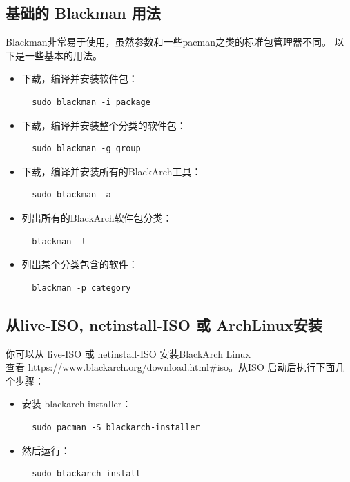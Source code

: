 \documentclass[a4paper, oneside, 11pt]{book}
\begin{document}
\subsection{基础的 Blackman 用法} Blackman非常易于使用，虽然参数和一些pacman之类的标准包管理器不同。
以下是一些基本的用法。
\begin{itemize}
\item 下载，编译并安装软件包：
\begin{lstlisting}
  sudo blackman -i package
\end{lstlisting}

\item 下载，编译并安装整个分类的软件包：
\begin{lstlisting}
  sudo blackman -g group
\end{lstlisting}

\item 下载，编译并安装所有的BlackArch工具：
\begin{lstlisting}
  sudo blackman -a
\end{lstlisting}

\item 列出所有的BlackArch软件包分类：
\begin{lstlisting}
  blackman -l
\end{lstlisting}

\item 列出某个分类包含的软件：
\begin{lstlisting}
  blackman -p category
\end{lstlisting}

\end{itemize}

\subsection{从live-ISO, netinstall-ISO 或 ArchLinux安装}
你可以从 live-ISO 或 netinstall-ISO 安装BlackArch Linux\\查看
\url{https://www.blackarch.org/download.html#iso}。从ISO 启动后执行下面几个步骤：
\begin{itemize}
\item 安装 blackarch-installer：
\begin{lstlisting}
  sudo pacman -S blackarch-installer
\end{lstlisting}

\item 然后运行：
\begin{lstlisting}
  sudo blackarch-install
\end{lstlisting}

\end{itemize}
\end{document}

